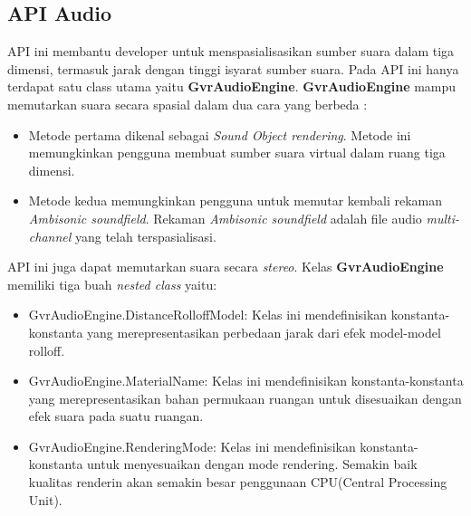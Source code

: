 \subsection{API Audio}
\label{sec:api_audio}
API ini membantu developer untuk menspasialisasikan sumber suara dalam tiga dimensi, termasuk jarak dengan tinggi isyarat sumber suara. Pada API ini hanya terdapat satu class utama yaitu \textbf{GvrAudioEngine}. \textbf{GvrAudioEngine} mampu memutarkan suara secara spasial dalam dua cara yang berbeda :
\begin{itemize}
	\item Metode pertama dikenal sebagai \textit{Sound Object rendering}. Metode ini memungkinkan pengguna membuat sumber suara virtual dalam ruang tiga dimensi.
	\item Metode kedua memungkinkan pengguna untuk memutar kembali rekaman \textit{Ambisonic soundfield}. Rekaman \textit{Ambisonic soundfield} adalah file audio \textit{multi-channel} yang telah terspasialisasi.
\end{itemize}
API ini juga dapat memutarkan suara secara \textit{stereo}. Kelas \textbf{GvrAudioEngine} memiliki tiga buah \textit{nested class} yaitu:
\begin{itemize}
	\item GvrAudioEngine.DistanceRolloffModel: Kelas ini mendefinisikan konstanta-konstanta yang merepresentasikan perbedaan jarak dari efek model-model rolloff. 
	\item GvrAudioEngine.MaterialName: Kelas ini mendefinisikan konstanta-konstanta yang merepresentasikan bahan permukaan ruangan untuk disesuaikan dengan efek suara pada suatu ruangan.
	\item GvrAudioEngine.RenderingMode: Kelas ini mendefinisikan konstanta-konstanta untuk menyesuaikan dengan mode rendering. Semakin baik kualitas renderin akan semakin besar penggunaan CPU(Central Processing Unit).
\end{itemize}

